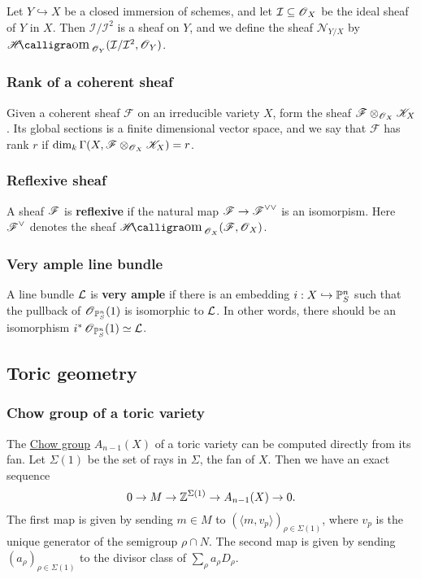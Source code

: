 \documentclass[11pt, english]{article}
\begin{document}
Let $Y \hookrightarrow X$ be a closed immersion of schemes, and let $\mathcal I \subseteq \operatorname{\mathscr{O}}_X$ be the ideal sheaf of $Y$ in $X$. Then $\mathcal I/\mathcal I^2$ is a sheaf on $Y$, and we define the sheaf $\mathcal N_{Y/X}$ by $\Shom_{\OO_Y}(\mathcal I/\mathcal I^2, \mathcal \OO_Y)$.

\subsubsection{Rank of a coherent sheaf}
\label{ranksheaf}

Given a coherent sheaf $\mathscr F$ on an irreducible variety $X$, form the sheaf ${\mathscr F \otimes_{\operatorname{\mathscr{O}}_X} \mathscr K_X}$. Its global sections is a finite dimensional vector space, and we say that $\mathscr F$ has rank $r$ if $\dim_k \Gamma(X,\mathscr F \otimes_{\operatorname{\mathscr{O}}_X} \mathscr K_X) = r$.

\subsubsection{Reflexive sheaf}
\label{reflexivesheaf}

A sheaf $\operatorname{\mathscr{F}}$ is \textbf{reflexive} if the natural map $\operatorname{\mathscr{F}} \to \operatorname{\mathscr{F}}^{\vee\vee}$ is an isomorpism. Here $\operatorname{\mathscr{F}}^\vee$ denotes the sheaf $\Shom_{\OO_X}(\FF,\OO_X)$.

\subsubsection{Very ample line bundle}
\label{veryample}
A line bundle $\mathcal{L}$ is \textbf{very ample} if there is an embedding $i:X \hookrightarrow \mathbb{P}_S^n$ such that the pullback of $\operatorname{\mathscr{O}}_{\mathbb{P}_S^n}(1)$ is isomorphic to $\mathcal{L}$. In other words, there should be an isomorphism $i^\ast \operatorname{\mathscr{O}}_{\mathbb{P}^n_S}(1) \simeq \mathcal{L}$.

\subsection{Toric geometry}

\subsubsection{Chow group of a toric variety}
\label{chowtoric}

The \hyperref[chowgroup]{Chow group} $A_{n-1}(X)$ of a toric variety can be computed directly from its fan. Let $\Sigma(1)$ be the set of rays in $\Sigma$, the fan of $X$. Then we have an exact sequence
\[
 0 \to M \to \mathbb{Z}^{\Sigma(1)} \to A_{n-1}(X) \to 0.
\] 
The first map is given by sending $m \in M$ to $(\langle m,v_p \rangle )_{\rho \in \Sigma(1)}$, where $v_p$ is the unique generator of the semigroup $\rho \cap N$. The second map is given by sending $(a_\rho)_{\rho \in \Sigma(1)}$ to the divisor class of $\sum_\rho  a_\rho D_\rho$. 
\end{document}
